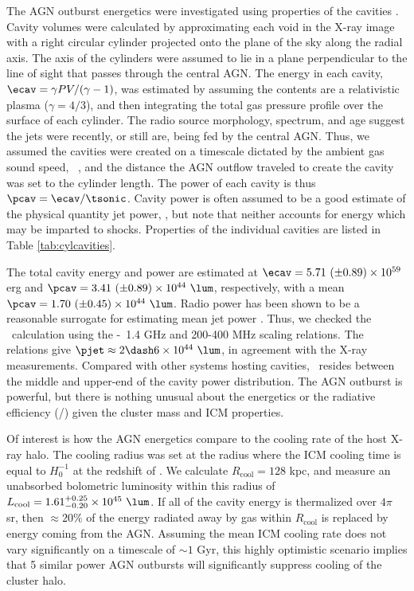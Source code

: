 \documentclass[useAMS,usenatbib]{mn2e}
\begin{document}
The AGN outburst energetics were investigated using properties of the
cavities \citep[see][for a review]{mcnamrev}. Cavity volumes were
calculated by approximating each void in the X-ray image with a right
circular cylinder projected onto the plane of the sky along the radial
axis. The axis of the cylinders were assumed to lie in a plane
perpendicular to the line of sight that passes through the central
AGN. The energy in each cavity, $\ecav = \gamma PV/(\gamma-1)$, was
estimated by assuming the contents are a relativistic plasma ($\gamma
= 4/3$), and then integrating the total gas pressure profile over the
surface of each cylinder. The radio source morphology, spectrum, and
age suggest the jets were recently, or still are, being fed by the
central AGN. Thus, we assumed the cavities were created on a timescale
dictated by the ambient gas sound speed,
\tsonic\ \citep[see][]{birzan04}, and the distance the AGN outflow
traveled to create the cavity was set to the cylinder length. The
power of each cavity is thus $\pcav = \ecav/\tsonic$. Cavity power is
often assumed to be a good estimate of the physical quantity jet
power, \pjet, but note that neither accounts for energy which may be
imparted to shocks. Properties of the individual cavities are listed
in Table \ref{tab:cylcavities}.

The total cavity energy and power are estimated at $\ecav = 5.71 ~(\pm
0.89) \times 10^{59}$ erg and $\pcav = 3.41 ~(\pm 0.89) \times 10^{44}
~\lum$, respectively, with a mean $\pcav = 1.70 ~(\pm 0.45) \times
10^{44} ~\lum$. Radio power has been shown to be a reasonable
surrogate for estimating mean jet power \citep{birzan08}. Thus, we
checked the \pcav\ calculation using the \citet{pjet} \pjet-\prad\ 1.4
GHz and 200-400 MHz scaling relations. The relations give $\pjet
\approx 2 \dash 6 \times 10^{44} ~\lum$, in agreement with the X-ray
measurements. Compared with other systems hosting cavities,
\irs\ resides between the middle and upper-end of the cavity power
distribution. The AGN outburst is powerful, but there is nothing
unusual about the energetics or the radiative efficiency (\prad/\pjet)
given the cluster mass and ICM properties.

Of interest is how the AGN energetics compare to the cooling rate of
the host X-ray halo. The cooling radius was set at the radius where
the ICM cooling time is equal to $H_0^{-1}$ at the redshift of
\irs. We calculate $R_{\mathrm{cool}} = 128$ kpc, and measure an
unabsorbed bolometric luminosity within this radius of
$L_{\mathrm{cool}} = 1.61^{+0.25}_{-0.20} \times 10^{45} ~\lum$. If
all of the cavity energy is thermalized over $4\pi$ sr, then $\approx
20\%$ of the energy radiated away by gas within $R_{\mathrm{cool}}$ is
replaced by energy coming from the AGN. Assuming the mean ICM cooling
rate does not vary significantly on a timescale of $\sim 1$ Gyr, this
highly optimistic scenario implies that 5 similar power AGN outbursts
will significantly suppress cooling of the cluster halo.
\end{document}
